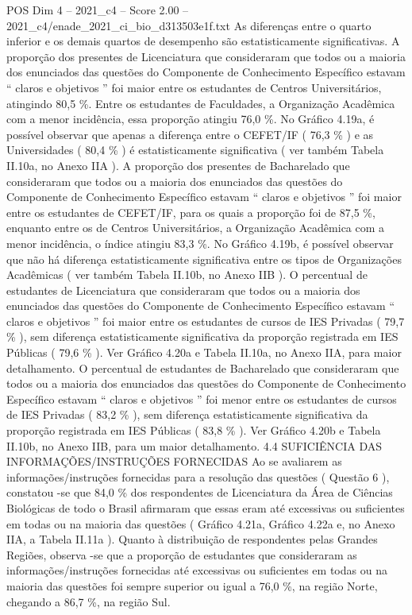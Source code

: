 \begin{textsample}{POS Dim 4 – 2021\_c4 – Score 2.00 – 2021\_c4/enade\_2021\_ci\_bio\_d313503e1f.txt}
As diferenças entre o quarto inferior e os demais quartos de desempenho são estatisticamente significativas.
A proporção dos presentes de Licenciatura que consideraram que todos ou a maioria dos enunciados das questões do Componente de Conhecimento Específico estavam “ claros e objetivos ” foi maior entre os estudantes de Centros Universitários, atingindo 80,5 \%.
Entre os estudantes de Faculdades, a Organização Acadêmica com a menor incidência, essa proporção atingiu 76,0 \%.
No Gráfico 4.19a, é possível observar que apenas a diferença entre o CEFET/IF ( 76,3 \% ) e as Universidades ( 80,4 \% ) é estatisticamente significativa ( ver também Tabela II.10a, no Anexo IIA ).
A proporção dos presentes de Bacharelado que consideraram que todos ou a maioria dos enunciados das questões do Componente de Conhecimento Específico estavam “ claros e objetivos ” foi maior entre os estudantes de CEFET/IF, para os quais a proporção foi de 87,5 \%, enquanto entre os de Centros Universitários, a Organização Acadêmica com a menor incidência, o índice atingiu 83,3 \%.
No Gráfico 4.19b, é possível observar que não há diferença estatisticamente significativa entre os tipos de Organizações Acadêmicas ( ver também Tabela II.10b, no Anexo IIB ).
O percentual de estudantes de Licenciatura que consideraram que todos ou a maioria dos enunciados das questões do Componente de Conhecimento Específico estavam “ claros e objetivos ” foi maior entre os estudantes de cursos de IES Privadas ( 79,7 \% ), sem diferença estatisticamente significativa da proporção registrada em IES Públicas ( 79,6 \% ).
Ver Gráfico 4.20a e Tabela II.10a, no Anexo IIA, para maior detalhamento.
O percentual de estudantes de Bacharelado que consideraram que todos ou a maioria dos enunciados das questões do Componente de Conhecimento Específico estavam “ claros e objetivos ” foi menor entre os estudantes de cursos de IES Privadas ( 83,2 \% ), sem diferença estatisticamente significativa da proporção registrada em IES Públicas ( 83,8 \% ).
Ver Gráfico 4.20b e Tabela II.10b, no Anexo IIB, para um maior detalhamento. 4.4 SUFICIÊNCIA DAS INFORMAÇÕES/INSTRUÇÕES FORNECIDAS Ao se avaliarem as informações/instruções fornecidas para a resolução das questões ( Questão 6 ), constatou -se que 84,0 \% dos respondentes de Licenciatura da Área de Ciências Biológicas de todo o Brasil afirmaram que essas eram até excessivas ou suficientes em todas ou na maioria das questões ( Gráfico 4.21a, Gráfico 4.22a e, no Anexo IIA, a Tabela II.11a ).
Quanto à distribuição de respondentes pelas Grandes Regiões, observa -se que a proporção de estudantes que consideraram as informações/instruções fornecidas até excessivas ou suficientes em todas ou na maioria das questões foi sempre superior ou igual a 76,0 \%, na região Norte, chegando a 86,7 \%, na região Sul.

\end{textsample}
